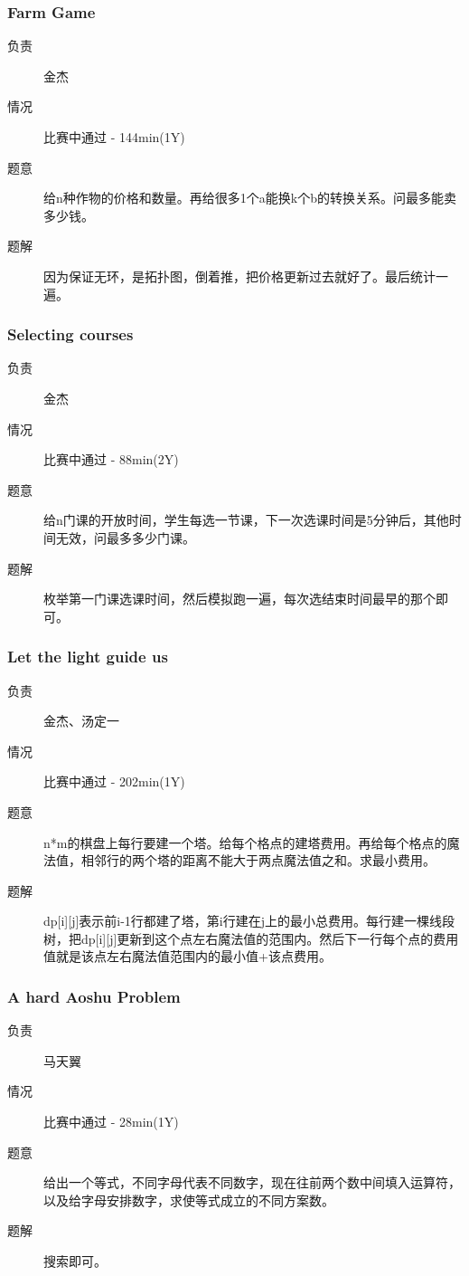 \documentclass[a4paper, 11pt, nofonts, nocap, fancyhdr]{ctexart}
\newcommand{\problem}[1]{\subsubsection{#1}}
\begin{document}
\problem{Farm Game}

\begin{description}
\item[负责] 金杰
\item[情况] 比赛中通过 - 144min(1Y)
\item[题意]
给n种作物的价格和数量。再给很多1个a能换k个b的转换关系。问最多能卖多少钱。
\item[题解]
因为保证无环，是拓扑图，倒着推，把价格更新过去就好了。最后统计一遍。
\end{description}

\problem{Selecting courses}

\begin{description}
\item[负责] 金杰
\item[情况] 比赛中通过 - 88min(2Y)
\item[题意]
给n门课的开放时间，学生每选一节课，下一次选课时间是5分钟后，其他时间无效，问最多多少门课。
\item[题解]
枚举第一门课选课时间，然后模拟跑一遍，每次选结束时间最早的那个即可。
\end{description}

\problem{Let the light guide us}

\begin{description}
\item[负责] 金杰、汤定一
\item[情况] 比赛中通过 - 202min(1Y)
\item[题意]
n*m的棋盘上每行要建一个塔。给每个格点的建塔费用。再给每个格点的魔法值，相邻行的两个塔的距离不能大于两点魔法值之和。求最小费用。
\item[题解]
dp[i][j]表示前i-1行都建了塔，第i行建在j上的最小总费用。每行建一棵线段树，把dp[i][j]更新到这个点左右魔法值的范围内。然后下一行每个点的费用值就是该点左右魔法值范围内的最小值+该点费用。
\end{description}

\problem{A hard Aoshu Problem}

\begin{description}
\item[负责] 马天翼
\item[情况] 比赛中通过 - 28min(1Y)
\item[题意]
给出一个等式，不同字母代表不同数字，现在往前两个数中间填入运算符，以及给字母安排数字，求使等式成立的不同方案数。
\item[题解]
搜索即可。
\end{description}
\end{document}
